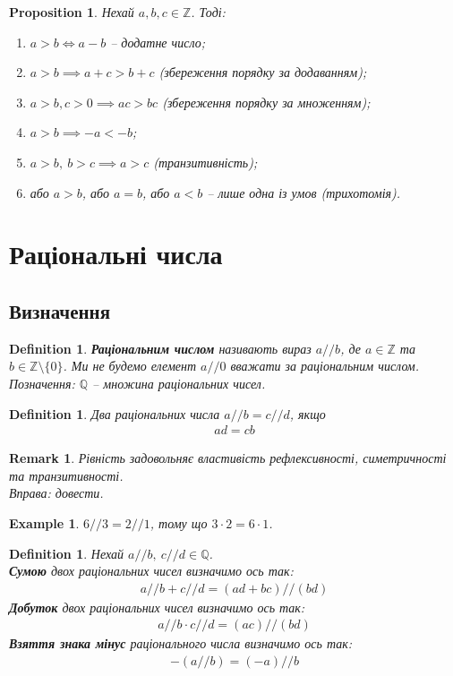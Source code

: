 \documentclass[a4paper, 14pt]{extarticle}
\theoremstyle{theoremdd}
\theoremstyle{theoremdd}
\newtheorem{definition}[theorem]{Definition}
\theoremstyle{theoremdd}
\theoremstyle{theoremdd}
\theoremstyle{theoremdd}
\theoremstyle{theoremdd}
\newtheorem{example}[theorem]{Example}
\theoremstyle{theoremdd}
\theoremstyle{theoremdd}
\theoremstyle{theoremdd}
\theoremstyle{theoremdd}
\newtheorem{proposition}[theorem]{Proposition}
\theoremstyle{theoremdd}
\theoremstyle{theoremdd}
\newtheorem{remark}[theorem]{Remark}
\theoremstyle{theoremdd}
\theoremstyle{theoremdd}
\theoremstyle{theoremdd}
\theoremstyle{theoremdd}
\begin{document}
\begin{proposition}
Нехай $a,b,c \in \mathbb{Z}$. Тоді:
\begin{enumerate}[nosep,wide=0pt,label={\arabic*)}]
\item $a > b \iff a - b$ -- додатне число;
\item $a > b \implies a + c > b + c$ (збереження порядку за додаванням);
\item $a > b, c > 0 \implies ac > bc$ (збереження порядку за множенням);
\item $a > b \implies -a < -b$;
\item $a > b, \ b > c \implies a > c$ (транзитивність);
\item або $a > b$, або $a = b$, або $a < b$ -- лише одна із умов (трихотомія).
\end{enumerate}
\end{proposition}
\newpage

\section{Раціональні числа}
\subsection{Визначення}
\begin{definition}
\textbf{Раціональним числом} називають вираз $a//b$, де $a \in \mathbb{Z}$ та $b \in \mathbb{Z} \setminus \{0\}$. Ми не будемо елемент $a//0$ вважати за раціональним числом.
\bigskip \\
Позначення: $\mathbb{Q}$ -- множина раціональних чисел.
\end{definition}

\begin{definition}
Два раціональних числа $a//b = c//d$, якщо
\begin{align*}
ad = cb
\end{align*}
\end{definition}

\begin{remark}
Рівність задовольняє властивість рефлексивності, симетричності та транзитивності.\\
\textit{Вправа: довести}.
\end{remark}

\begin{example}
$6//3 = 2//1$, тому що $3 \cdot 2 = 6 \cdot 1$.
\end{example}

\begin{definition}
Нехай $a//b,\ c//d \in \mathbb{Q}$.\\
\textbf{Сумою} двох раціональних чисел визначимо ось так:
\begin{align*}
a//b + c//d = (ad+bc)//(bd)
\end{align*}
\textbf{Добуток} двох раціональних чисел визначимо ось так:
\begin{align*}
a//b \cdot c//d = (ac)//(bd)
\end{align*}
\textbf{Взяття знака мінус} раціонального числа визначимо ось так:
\begin{align*}
-(a//b) = (-a)//b
\end{align*}
\end{definition}
\end{document}
